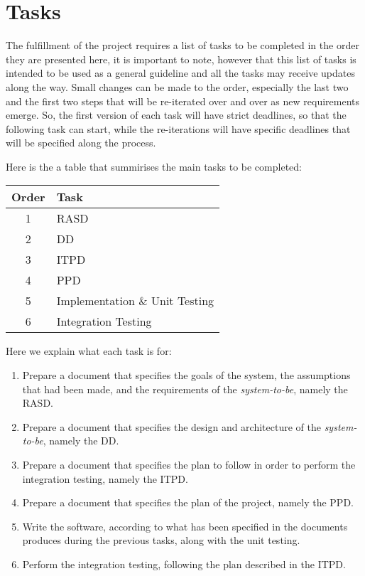 \section{Tasks} %
\label{sec:tasks}

The fulfillment of the project requires a list of tasks to be completed in the order they are presented here, it is important to note, however that this list of tasks is intended to be used as a general guideline and all the tasks may receive updates along the way.
Small changes can be made to the order, especially the last two and the first two steps that will be re-iterated over and over as new requirements emerge.
So, the first version of each task will have strict deadlines, so that the following task can start, while the re-iterations will have specific deadlines that will be specified along the process.

Here is the a table that summirises the main tasks to be completed:
\begin{center}
\begin{tabular}{ |c|l| } \hline
	\textbf{Order} & \textbf{Task} \\ \hline
	1 & RASD \\ \hline
	2 & DD \\ \hline
	3 & ITPD \\ \hline
	4 & PPD \\ \hline
	5 & Implementation \& Unit Testing \\ \hline
	6 & Integration Testing \\ \hline
\end{tabular}
\end{center}

Here we explain what each task is for:

\begin{enumerate}
	\item Prepare a document that specifies the goals of the system, the assumptions that had been made, and the requirements of the \emph{system-to-be}, namely the RASD.
	\item Prepare a document that specifies the design and architecture of the \emph{system-to-be}, namely the DD.
	\item Prepare a document that specifies the plan to follow in order to perform the integration testing, namely the ITPD.
	\item Prepare a document that specifies the plan of the project, namely the PPD.
	\item Write the software, according to what has been specified in the documents produces during the previous tasks, along with the unit testing.
	\item Perform the integration testing, following the plan described in the ITPD.
\end{enumerate}

